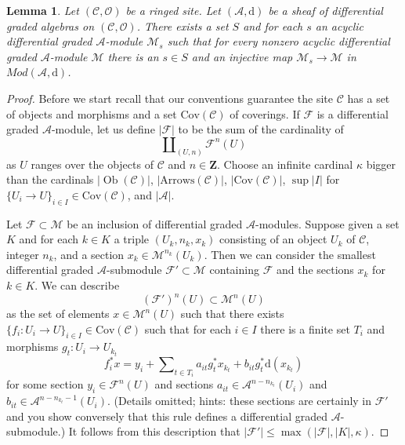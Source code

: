 \documentclass{stacks-project}
\theoremstyle{plain}
\newtheorem{lemma}[subsection]{Lemma}
\theoremstyle{definition}
\theoremstyle{remark}
\numberwithin{equation}{subsection}
\def\Ob{\mathop{\mathrm{Ob}}\nolimits}
\begin{document}
\begin{lemma}
\label{lemma-small-acyclics}
Let $(\mathcal{C}, \mathcal{O})$ be a ringed site.
Let $(\mathcal{A}, \text{d})$ be a sheaf of differential graded algebras
on $(\mathcal{C}, \mathcal{O})$. There exists a set $S$ and for each $s$
an acyclic differential graded $\mathcal{A}$-module $\mathcal{M}_s$ such
that for every nonzero acyclic differential graded $\mathcal{A}$-module
$\mathcal{M}$ there is an $s \in S$ and an injective map
$\mathcal{M}_s \to \mathcal{M}$ in $\textit{Mod}(\mathcal{A}, \text{d})$.
\end{lemma}

\begin{proof}
Before we start recall that our conventions guarantee the site $\mathcal{C}$
has a set of objects and morphisms and a set $\text{Cov}(\mathcal{C})$
of coverings.
If $\mathcal{F}$
is a differential graded $\mathcal{A}$-module, let us define $|\mathcal{F}|$
to be the sum of the cardinality of
$$
\coprod\nolimits_{(U, n)} \mathcal{F}^n(U)
$$
as $U$ ranges over the objects of $\mathcal{C}$ and $n \in \mathbf{Z}$.
Choose an infinite cardinal $\kappa$ bigger than
the cardinals $|\Ob(\mathcal{C})|$, $|\text{Arrows}(\mathcal{C})|$,
$|\text{Cov}(\mathcal{C})|$, $\sup |I|$ for
$\{U_i \to U\}_{i \in I} \in \text{Cov}(\mathcal{C})$,
and $|\mathcal{A}|$.

\medskip\noindent
Let $\mathcal{F} \subset \mathcal{M}$ be an inclusion of
differential graded $\mathcal{A}$-modules.
Suppose given a set $K$ and for each $k \in K$ a triple
$(U_k, n_k, x_k)$ consisting of an object $U_k$ of $\mathcal{C}$,
integer $n_k$, and a section $x_k \in \mathcal{M}^{n_k}(U_k)$.
Then we can consider the smallest differential graded
$\mathcal{A}$-submodule $\mathcal{F}' \subset \mathcal{M}$
containing $\mathcal{F}$ and the sections $x_k$ for $k \in K$.
We can describe
$$
(\mathcal{F}')^n(U) \subset \mathcal{M}^n(U)
$$
as the set of elements $x \in \mathcal{M}^n(U)$ such that there
exists $\{f_i : U_i \to U\}_{i \in I} \in \text{Cov}(\mathcal{C})$ such that
for each $i \in I$ there is a finite set $T_i$ and morphisms
$g_t : U_i \to U_{k_t}$
$$
f_i^*x = y_i +
\sum\nolimits_{t \in T_i} a_{it}g_t^*x_{k_t} + b_{it}g_t^*\text{d}(x_{k_t})
$$
for some section $y_i \in \mathcal{F}^n(U)$ and
sections $a_{it} \in \mathcal{A}^{n - n_{k_t}}(U_i)$
and $b_{it} \in \mathcal{A}^{n - n_{k_t} - 1}(U_i)$.
(Details omitted; hints: these sections are certainly in $\mathcal{F}'$
and you show conversely that this rule defines a differential
graded $\mathcal{A}$-submodule.)
It follows from this description that
$|\mathcal{F}'| \leq \max(|\mathcal{F}|, |K|, \kappa)$.


\end{proof}
\end{document}
